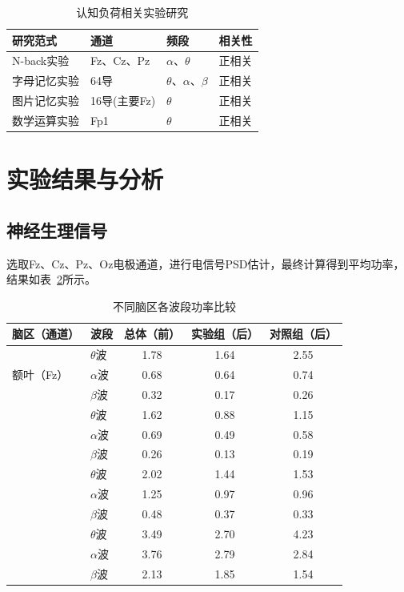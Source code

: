 \documentclass[runningheads]{llncs}
\begin{document}
\begin{table}
  \centering
  \caption{认知负荷相关实验研究}
  \begin{tabular}{llll}
    \toprule
    研究范式 & 通道 & 频段 & 相关性                  \\
    \midrule
    N-back实验\cite{pergher2019mental} & Fz、Cz、Pz & $\alpha$、$\theta$ & 正相关\\
    字母记忆实验\cite{bashivan2015single} & 64导 & $\theta$、$\alpha$、$\beta$ & 正相关                    \\
    图片记忆实验\cite{zhang2016functional} & 16导(主要Fz) & $\theta$ & 正相关   \\
    数学运算实验\cite{so2017evaluation} & Fp1 & $\theta$ & 正相关  \\
    \bottomrule
  \end{tabular}
  \label{tab:1}
\end{table}

\section{实验结果与分析}
\subsection{神经生理信号}
选取Fz、Cz、Pz、Oz电极通道，进行电信号PSD估计，最终计算得到平均功率，结果如表~\ref{tab:3}所示。

\begin{table}[t]
\centering
\caption{不同脑区各波段功率比较}
\label{tab:3}
\begin{tabular}{llccc}
\toprule
脑区（通道） & 波段 & 总体（前） & 实验组（后） & 对照组（后） \\
\midrule
\multirow{3}{*}{额叶（Fz）} & $\theta$波 & 1.78 & 1.64 & 2.55 \\
 & $\alpha$波 & 0.68 & 0.64 & 0.74 \\
 & $\beta$波 & 0.32 & 0.17 & 0.26 \\
\addlinespace
\multirow{3}{*}{额叶中心沟（Cz）} & $\theta$波 & 1.62 & 0.88 & 1.15 \\
 & $\alpha$波 & 0.69 & 0.49 & 0.58 \\
 & $\beta$波 & 0.26 & 0.13 & 0.19 \\
\addlinespace
\multirow{3}{*}{顶叶（Pz）} & $\theta$波 & 2.02 & 1.44 & 1.53 \\
 & $\alpha$波 & 1.25 & 0.97 & 0.96 \\
 & $\beta$波 & 0.48 & 0.37 & 0.33 \\
\addlinespace
\multirow{3}{*}{枕叶（Oz）} & $\theta$波 & 3.49 & 2.70 & 4.23 \\
 & $\alpha$波 & 3.76 & 2.79 & 2.84 \\
 & $\beta$波 & 2.13 & 1.85 & 1.54 \\
\bottomrule
\end{tabular}
\end{table}
\end{document}
